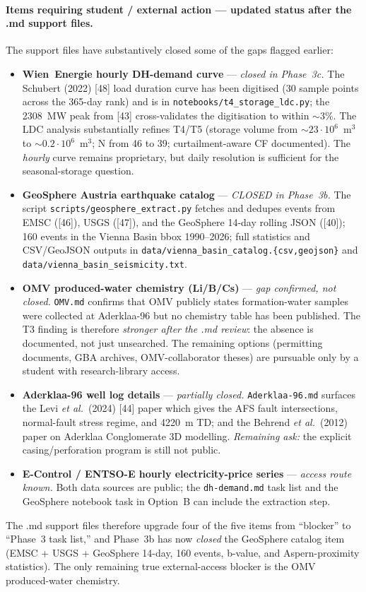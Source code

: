 \documentclass{article}
\begin{document}
\paragraph{Items requiring student / external action --- updated
status after the .md support files.} The
support files have substantively closed some of the gaps flagged
earlier:
\begin{itemize}
\item \textbf{Wien~Energie hourly DH-demand curve} ---
\emph{closed in Phase~3c.} The Schubert (2022) [48] load duration
curve has been digitised (30 sample points across the 365-day rank)
and is in \texttt{notebooks/t4\_storage\_ldc.py}; the 2308~MW
peak from [43] cross-validates the digitisation to within $\sim 3\%$.
The LDC analysis substantially refines T4/T5 (storage volume from
$\sim 23\cdot 10^{6}$~m$^3$ to $\sim 0.2\cdot 10^{6}$~m$^3$;
N from 46 to 39; curtailment-aware CF documented). The
\emph{hourly} curve remains proprietary, but daily resolution is
sufficient for the seasonal-storage question.
\item \textbf{GeoSphere Austria earthquake catalog} ---
\emph{CLOSED in Phase~3b.} The script
\texttt{scripts/geosphere\_extract.py} fetches and dedupes events
from EMSC ([46]), USGS ([47]), and the GeoSphere
14-day rolling JSON ([40]); 160 events in the Vienna Basin bbox
1990--2026; full statistics and CSV/GeoJSON outputs in
\texttt{data/vienna\_basin\_catalog.\{csv,geojson\}} and
\texttt{data/vienna\_basin\_seismicity.txt}.
\item \textbf{OMV produced-water chemistry (Li/B/Cs)} ---
\emph{gap confirmed, not closed.} \texttt{OMV.md} confirms that
OMV publicly states formation-water samples were collected at
Aderklaa-96 but no chemistry table has been published. The T3
finding is therefore \emph{stronger after the .md review}: the
absence is documented, not just unsearched. The remaining
options (permitting documents, GBA archives, OMV-collaborator
theses) are pursuable only by a student with research-library
access.
\item \textbf{Aderklaa-96 well log details} --- \emph{partially
closed.} \texttt{Aderklaa-96.md} surfaces the Levi \emph{et al.}\
(2024) [44] paper which gives the AFS fault intersections,
normal-fault stress regime, and 4220~m TD; and the Behrend
\emph{et al.}\ (2012) paper on Aderklaa Conglomerate 3D
modelling. \emph{Remaining ask:} the explicit casing/perforation
program is still not public.
\item \textbf{E-Control / ENTSO-E hourly electricity-price series} ---
\emph{access route known.} Both data sources are public; the
\texttt{dh-demand.md} task list and the GeoSphere notebook task
in Option~B can include the extraction step.
\end{itemize}
The .md support files therefore upgrade four of the five items
from ``blocker'' to ``Phase~3 task list,'' and Phase~3b has now
\emph{closed} the GeoSphere catalog item (EMSC + USGS + GeoSphere
14-day, 160 events, b-value, and Aspern-proximity statistics).
The only remaining true external-access blocker is the OMV
produced-water chemistry.
\end{document}
